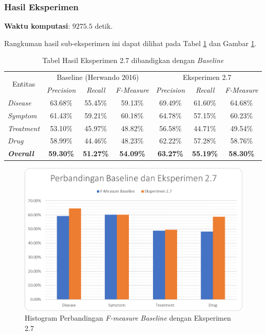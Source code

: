	\subsubsection{Hasil Eksperimen}
	\textbf{Waktu komputasi}: $ 9275.5 $ detik.
	
	Rangkuman hasil sub-eksperimen ini dapat dilihat pada Tabel \ref{table:owndict7} dan Gambar \ref{fig:owndict7}.
	
	\begin{table}
		\centering
		\caption{Tabel Hasil Eksperimen 2.7 dibandigkan dengan \textit{Baseline}}
		\begin{tabular}{|l|c|c|c|c|c|c|}
			\hline
			\multicolumn{1}{|c|}{\multirow{2}{*}{Entitas}} & \multicolumn{3}{c|}{Baseline (Herwando 2016)} & \multicolumn{3}{c|}{Eksperimen 2.7} \\ \cline{2-7} 
			\multicolumn{1}{|c|}{} & \textit{Precision} & \textit{Recall} & \textit{F-Measure} & \textit{Precision} & \textit{Recall} & \textit{F-Measure} \\ \hline
			\textit{Disease} & 63.68\% & 55.45\% & 59.13\% & 69.49\% & 61.60\% & 64.68\% \\ \hline
			\textit{Symptom} & 61.43\% & 59.21\% & 60.18\% & 64.78\% & 57.15\% & 60.23\% \\ \hline
			\textit{Treatment} & 53.10\% & 45.97\% & 48.82\% & 56.58\% & 44.71\% & 49.54\% \\ \hline
			\textit{Drug} & 58.99\% & 44.46\% & 48.23\% & 62.22\% & 57.28\% & 58.76\% \\ \hline
			\textit{\textbf{Overall}} & \textbf{59.30\%} & \textbf{51.27\%} & \textbf{54.09\%} & \textbf{63.27\%} & \textbf{55.19\%} & \textbf{58.30\%} \\ \hline
		\end{tabular}
		\label{table:owndict7}
	\end{table}
	
	\begin{figure}
		\centering
		\includegraphics[width=0.85\linewidth]{images/histogram7}
		\caption{Histogram Perbandingan \textit{F-measure} \textit{Baseline} dengan Eksperimen 2.7}
		\label{fig:owndict7}
	\end{figure}
	
